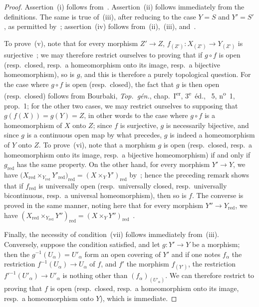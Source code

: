 \begin{proof}
Assertion~(i) follows from~.
Assertion~(ii) follows immediately from the definitions. The same is true of~(iii), after reducing to the case $Y=S$ and $Y'=S'$, as permitted by~; assertion~(iv) follows from~(ii),~(iii), and~.

To prove~(v), note that for every morphism $Z'\to Z$, $f_{(Z')}:X_{(Z')}\to Y_{(Z')}$
is surjective~; we may therefore restrict ourselves to proving
that if $g\circ f$ is open
\textnormal{(}resp.\ closed, resp.\ a
homeomorphism onto its image, resp.\ a bijective homeomorphism\textnormal{)},
so is $g$, and this is therefore a purely topological question. For the case
where $g\circ f$ is open \textnormal{(}resp.\ closed\textnormal{)}, the fact
that $g$ is then open \textnormal{(}resp.\ closed\textnormal{)} follows from
Bourbaki, \emph{Top.~g\'{e}n.}, chap.~I\textsuperscript{er},
3\textsuperscript{e}~\'{e}d., \textsection~5, n\textsuperscript{o}~1,
prop.~1; for the other two cases, we may restrict ourselves to supposing that
$g(f(X))=g(Y)=Z$, in other words to the case where $g\circ f$ is a
homeomorphism of $X$ onto $Z$; since $f$ is surjective, $g$ is necessarily
bijective, and since $g$ is a continuous open map by what precedes, $g$ is
indeed a homeomorphism of $Y$ onto $Z$.
To prove~(vi), note that a morphism $g$ is open \textnormal{(}resp.\ closed, resp.\ a homeomorphism onto its image, resp.\ a bijective homeomorphism\textnormal{)} if and only if $g_{\mathrm{red}}$ has the same property.
On the other hand, for every morphism $Y'\to Y$, we have $\bigl(X_{\mathrm{red}}\times_{Y_{\mathrm{red}}}Y'_{\mathrm{red}}\bigr)_{\mathrm{red}}
=(X\times_Y Y')_{\mathrm{red}}$
by~; hence the preceding remark shows that if $f_{\mathrm{red}}$ is universally open \textnormal{(}resp.\ universally closed, resp.\ universally bicontinuous, resp.\ a universal homeomorphism\textnormal{)}, then so is $f$.
The converse is proved in the same manner, noting here that for every morphism $Y''\to Y_{\mathrm{red}}$, we have $(X_{\mathrm{red}}\times_{Y_{\mathrm{red}}}Y'')_{\mathrm{red}}=(X\times_Y Y'')_{\mathrm{red}}$~.

Finally, the necessity of condition~(vii) follows immediately from~(iii).
Conversely, suppose the condition satisfied, and let $g:Y'\to Y$ be a morphism; then the $g^{-1}(U_\alpha)=U'_\alpha$ form an open covering of $Y'$ and if one notes $f_\alpha$ the restriction $f^{-1}(U_\alpha)\to U_\alpha$ of $f$, and $f'$ the morphism $f_{(Y')}$, the restriction $f'^{-1}(U'_\alpha)\to U'_\alpha$ is nothing other than $(f_\alpha)_{(U'_\alpha)}$.
We can therefore restrict to proving that $f$ is open \textnormal{(}resp.\ closed, resp.\ a homeomorphism onto its image, resp.\ a homeomorphism onto $Y$\textnormal{)}, which is immediate.
\end{proof}

